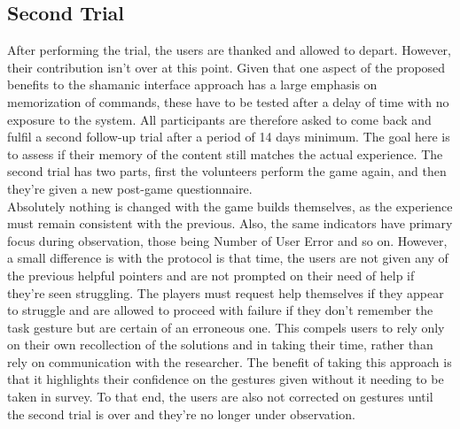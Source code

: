     \subsection{Second Trial} \label{sec:develop_trials_second}
    After performing the trial, the users are thanked and allowed to depart. However, their contribution isn’t over at this point. Given that one aspect of the proposed benefits to the shamanic interface approach has a large emphasis on memorization of commands, these have to be tested after a delay of time with no exposure to the system. All participants are therefore asked to come back and fulfil a second follow-up trial after a period of 14 days minimum. The goal here is to assess if their memory of the content still matches the actual experience. The second trial has two parts, first the volunteers perform the game again, and then they’re given a new post-game questionnaire.\\
    Absolutely nothing is changed with the game builds themselves, as the experience must remain consistent with the previous. Also, the same indicators have primary focus during observation, those being Number of User Error and so on. However, a small difference is with the protocol is that time, the users are not given any of the previous helpful pointers and are not prompted on their need of help if they’re seen struggling. The players must request help themselves if they appear to struggle and are allowed to proceed with failure if they don’t remember the task gesture but are certain of an erroneous one. This compels users to rely only on their own recollection of the solutions and in taking their time, rather than rely on communication with the researcher. The benefit of taking this approach is that it highlights their confidence on the gestures given without it needing to be taken in survey. To that end, the users are also not corrected on gestures until the second trial is over and they’re no longer under observation.\\
